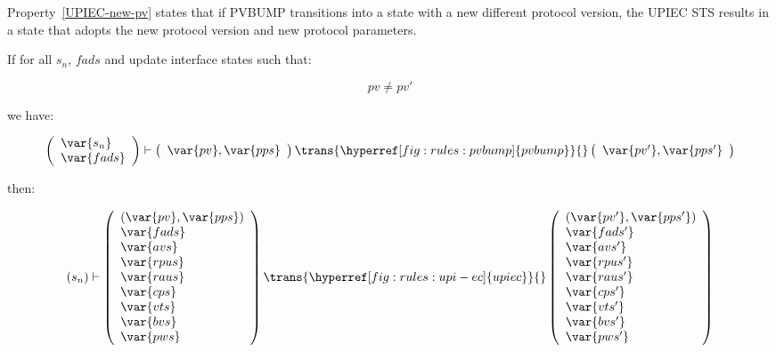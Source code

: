 Property~\ref{UPIEC-new-pv} states that if PVBUMP transitions into a state
with a new different protocol version, the UPIEC STS results in a state that
adopts the new protocol version and new protocol parameters.

\begin{property}\label{UPIEC-new-pv}
  \textnormal{If for all $s_n$, $fads$ and update interface states such that:}

  $$
  pv \neq pv'
  $$

  \textnormal{we have:}
  
  $$
  \left(
    \begin{array}{l}
      \var{s_n}\\
      \var{fads}
    \end{array}
  \right)
  \vdash
  \left(
    \begin{array}{l}
      \var{pv}, \var{pps}\\
    \end{array}
  \right)
  \trans{\hyperref[fig:rules:pvbump]{pvbump}}{}
  \left(
    \begin{array}{l}
      \var{pv'}, \var{pps'}\\
    \end{array}
  \right)
  $$

  \textnormal{then:}

  $$
  (s_n)
  \vdash
  \left(
    \begin{array}{l}
      (\var{pv}, \var{pps})\\
      \var{fads}\\
      \var{avs}\\
      \var{rpus}\\
      \var{raus}\\
      \var{cps}\\
      \var{vts}\\
      \var{bvs}\\
      \var{pws}
    \end{array}
  \right)
  \trans{\hyperref[fig:rules:upi-ec]{upiec}}{}
  \left(
    \begin{array}{l}
      (\var{pv'}, \var{pps'})\\
      \var{fads'}\\
      \var{avs'}\\
      \var{rpus'}\\
      \var{raus'}\\
      \var{cps'}\\
      \var{vts'}\\
      \var{bvs'}\\
      \var{pws'}
    \end{array}
  \right)
  $$
  
\end{property}

